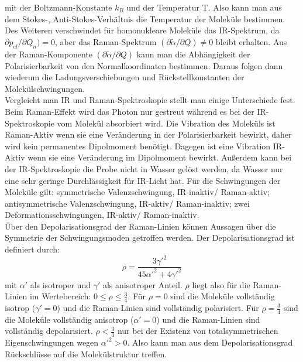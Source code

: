 \documentclass[.../bericht]{subfilies}
\begin{document}
      mit der Boltzmann-Konstante $k_B$ und der Temperatur T. Also kann man aus dem Stokes-, Anti-Stokes-Verhältnis die Temperatur der Moleküle bestimmen.
      Des Weiteren verschwindet für homonukleare Moleküle das IR-Spektrum, da $\partial p_{el}/ \partial Q_n)=0$, aber das Raman-Spektrum $(\partial \widetilde{\alpha} / \partial Q) \neq 0$ bleibt erhalten. Aus der Raman-Komponente $(\partial \widetilde{\alpha} / \partial Q)$ kann man die Abhängigkeit der Polarisierbarkeit von den Normalkoordinaten bestimmen. Daraus folgen dann wiederum die Ladungsverschiebungen und Rückstellkonstanten der Molekülschwingungen. \\
      Vergleicht man IR und Raman-Spektroskopie stellt man einige Unterschiede fest. Beim Raman-Effekt wird das Photon nur gestreut während es bei der IR-Spektroskopie vom Molekül absorbiert wird. Die Vibration des Moleküls ist Raman-Aktiv wenn sie eine Veränderung in der Polarisierbarkeit bewirkt, daher wird kein permanentes Dipolmoment benötigt. Dagegen ist eine Vibration IR-Aktiv wenn sie eine Veränderung im Dipolmoment bewirkt. Außerdem kann bei der IR-Spektroskopie die Probe nicht in Wasser gelöst werden, da Wasser nur eine sehr geringe Durchlässigkeit für IR-Licht hat. Für die Schwingungen der Moleküle gilt: symmetrische Valenzschwingung, IR-inaktiv/ Raman-aktiv; antisymmetrische Valenzschwingung, IR-aktiv/ Raman-inaktiv; zwei Deformationsschwingungen, IR-aktiv/ Raman-inaktiv. \\
      Über den Depolarisationsgrad der Raman-Linien können Aussagen über die Symmetrie der Schwingungsmoden getroffen werden. Der Depolarisationsgrad ist definiert durch:
      \begin{equation}
        \rho=\frac{3\gamma'^2}{45{\alpha'^2}+4\gamma'^2}
        \label{eq:depolarisation}
      \end{equation}
      mit $\alpha'$ als isotroper und $\gamma'$ als anisotroper Anteil. $\rho$ liegt also für die Raman-Linien im Wertebereich: $0\leq \rho \leq \frac{3}{4}$. Für $\rho=0$ sind die Moleküle vollständig isotrop ($\gamma'=0$) und die Raman-Linien sind vollständig polarisiert. Für $\rho=\frac{3}{4}$ sind die Moleküle vollständig anisotrop ($\alpha'=0$) und die Raman-Linien sind vollständig depolarisiert. $\rho<\frac{3}{4}$ nur bei der Existenz von totalsymmetrischen Eigenschwingungen wegen $\alpha'^2>0$. Also kann man aus dem Depolarisationsgrad Rückschlüsse auf die Molekülstruktur treffen.\\
      \cite{raman-ir} \cite{molekuel}
\end{document}
